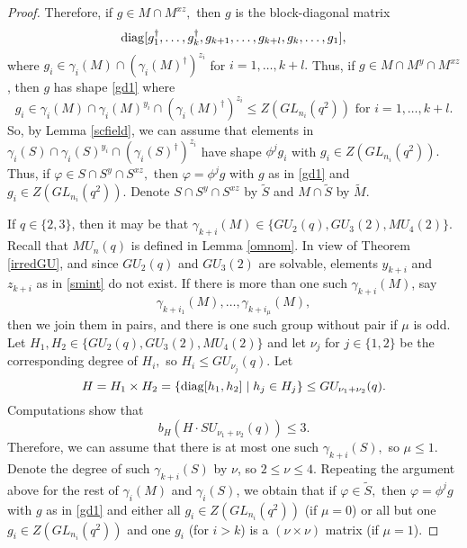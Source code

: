 \begin{proof}
 Therefore, if $g \in M \cap M^{xz},$ then $g$ is the block-diagonal matrix
\begin{equation}\label{gd1}
\mathrm{diag} [g_1^{\dagger}, \ldots, g_k^{\dagger}, g_{k+1}, \ldots, g_{k+l}, g_k, \ldots, g_1],
\end{equation}
where $g_i \in \gamma_i(M) \cap (\gamma_i(M)^{\dagger})^{z_i}$ for $i=1, \ldots, k+l.$ 
Thus, if $g \in M \cap M^{y} \cap M^{xz}$, then $g$ has shape \eqref{gd1} where
$$g_i \in \gamma_i(M) \cap \gamma_i(M)^{y_i} \cap (\gamma_i(M)^{\dagger})^{z_i} \le Z(GL_{n_i}(q^2)) \text{ for } i=1, \ldots, k+l.$$ 
So, by Lemma \ref{scfield}, we can assume that elements in $\gamma_i(S) \cap \gamma_i(S)^{y_i} \cap (\gamma_i(S)^{\dagger})^{z_i}$ have shape $\phi^j g_i$ with $g_i \in Z(GL_{n_i}(q^2)).$ Thus, if 
$ \varphi \in S \cap S^{y} \cap S^{xz},$ then $\varphi= \phi^jg$ with $g$ as in \eqref{gd1} and $g_i \in Z(GL_{n_i}(q^2)).$
 Denote $S \cap S^{y} \cap S^{xz}$ by $\tilde{S}$ and $M \cap \tilde{S}$ by $\tilde{M}.$



\medskip

If $q \in \{2,3\}$, then it may be that $\gamma_{k+i}(M) \in \{GU_2(q), GU_3(2), MU_4(2)\}.$ Recall that $MU_n(q)$ is defined in Lemma \ref{omnom}.  In view of Theorem \ref{irredGU}, and since $GU_2(q)$ and $GU_3(2)$ are solvable, elements $y_{k+i}$ and $z_{k+i}$ as in \eqref{smint} do not exist. If there is more than one such $\gamma_{k+i}(M)$, say 
\begin{equation*}%
\gamma_{k+i_1}(M), \ldots, \gamma_{k+i_{\mu}}(M),
\end{equation*}
then we join them in pairs, and there is one such group without pair if $\mu$ is odd. Let $H_1, H_2 \in \{GU_2(q), GU_3(2), MU_4(2)\}$ and let $\nu_j$ for $j \in \{1,2\}$ be the corresponding degree of $H_i,$ so $H_i \le GU_{\nu_j}(q).$ Let $$H=H_1 \times H_2=\{\mathrm{diag}[h_1, h_2] \mid h_j \in H_j\} \le GU_{\nu_1+ \nu_2}(q).$$  Computations show that $$b_H(H \cdot SU_{\nu_1+ \nu_2}(q)) \le 3.$$ Therefore, we can assume that there is at most one such $\gamma_{k+i}(S),$ so $\mu \le 1$. Denote the degree of such $\gamma_{k+i}(S)$ by $\nu$, so $2 \le \nu \le 4.$  Repeating the argument above for the rest of $\gamma_{i}(M)$ and $\gamma_{i}(S)$, we obtain that if $\varphi \in \tilde{S},$ then $\varphi =\phi^j g$ with $g$ as in \eqref{gd1} and either all $g_i \in Z(GL_{n_i}(q^2))$ (if $\mu=0$) or  all but one  $g_i \in Z(GL_{n_i}(q^2))$ and one $g_i$ (for $i>k$) is a 
$(\nu \times \nu)$ matrix (if $\mu=1$).   


\end{proof}
